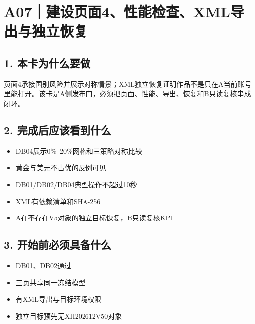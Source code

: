 \documentclass[UTF8,openany,zihao=-4]{ctexbook}
\renewcommand{\_}{\textunderscore\allowbreak}
\begin{document}
\clearpage
\section{A07｜建设页面4、性能检查、XML导出与独立恢复}
\subsection*{1. 本卡为什么要做}
页面4承接国别风险并展示对称情景；XML独立恢复证明作品不是只在A当前账号里能打开。该卡是A侧发布门，必须把页面、性能、导出、恢复和B只读复核串成闭环。


\subsection*{2. 完成后应该看到什么}
\begin{itemize}
\item DB04展示0\%--20\%网格和三策略对称比较
\item 黄金与美元不占优的反例可见
\item DB01/DB02/DB04典型操作不超过10秒
\item XML有依赖清单和SHA-256
\item A在不存在V5对象的独立目标恢复，B只读复核KPI
\end{itemize}

\subsection*{3. 开始前必须具备什么}
\begin{itemize}[label=$\square$]
\item DB01、DB02通过
\item 三页共享同一冻结模型
\item 有XML导出与目标环境权限
\item 独立目标预先无XH202612\_V50对象
\end{itemize}
\end{document}

